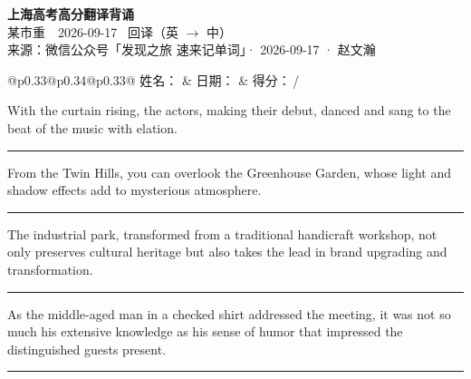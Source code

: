 \documentclass[11pt,a4paper]{article}
\newcommand{\num}[1]{\makebox[1.9em][r]{#1.}\hspace{0.3em}}
\newcommand{\wline}{\noindent\rule{\linewidth}{0.4pt}}
\begin{document}
\pagestyle{plain}
\begin{center}
{\LARGE\bfseries 上海高考高分翻译背诵 }\\[0.25em]
{\large 某市重　2026-09-17 \quad\ 回译（英 $\to$ 中）}\\[0.35em]
{\footnotesize 来源：微信公众号「发现之旅 速来记单词」· 2026-09-17 · 赵文瀚}
\end{center}

\vspace{0.4em}
\noindent\begin{tabular}{@{}p{0.33\textwidth}@{}p{0.34\textwidth}@{}p{0.33\textwidth}@{}}
姓名：\underline{\hspace{2.0cm}} & 日期：\underline{\hspace{2.0cm}} & 得分：\underline{\hspace{1.4cm}}\,/ \\
\end{tabular}

\vspace{0.5em}

\vspace{0.8em}
\num{1}With the curtain rising, the actors, making their debut, danced and sang to the beat of the music with elation.

\vspace{0.25em}

\wline

\num{2}From the Twin Hills, you can overlook the Greenhouse Garden, whose light and shadow effects add to mysterious atmosphere.

\vspace{0.25em}

\wline

\num{3}The industrial park, transformed from a traditional handicraft workshop, not only preserves cultural heritage but also takes the lead in brand upgrading and transformation.

\vspace{0.25em}

\wline

\num{4}As the middle-aged man in a checked shirt addressed the meeting, it was not so much his extensive knowledge as his sense of humor that impressed the distinguished guests present.

\vspace{0.25em}

\wline
\end{document}
